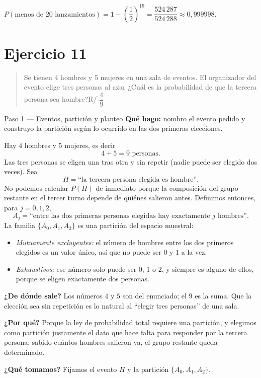 \documentclass[11pt]{article}
\begin{document}
\begin{resp}
$P(\text{menos de 20 lanzamientos})=1-\left(\dfrac{1}{2}\right)^{19}=\dfrac{524\,287}{524\,288}\approx 0{,}999998$.
\end{resp}

\section*{Ejercicio 11}

\begin{quote}
Se tienen 4 hombres y 5 mujeres en una sala de eventos. El organizador del evento elige tres personas al azar ¿Cuál es la probabilidad de que la tercera persona sea hombre?\hfill R/ $\dfrac{4}{9}$
\end{quote}

\begin{paso}{Paso 1 --- Eventos, partición y planteo}
\textbf{Qué hago:} nombro el evento pedido y construyo la partición según lo ocurrido en las dos primeras elecciones.

Hay $4$ hombres y $5$ mujeres, es decir
\[
4+5=9 \text{ personas.}
\]
Las tres personas se eligen una tras otra y sin repetir (nadie puede ser elegido dos veces). Sea
\[
H=\text{``la tercera persona elegida es hombre''}.
\]
No podemos calcular $P(H)$ de inmediato porque la composición del grupo restante en el tercer turno depende de quiénes salieron antes. Definimos entonces, para $j=0,1,2$,
\[
A_j=\text{``entre las dos primeras personas elegidas hay exactamente $j$ hombres''}.
\]
La familia $\{A_0,A_1,A_2\}$ es una partición del espacio muestral:
\begin{itemize}[leftmargin=1.4em]
\item \emph{Mutuamente excluyentes:} el número de hombres entre los dos primeros elegidos es un valor único, así que no puede ser $0$ y $1$ a la vez.
\item \emph{Exhaustivos:} ese número solo puede ser $0$, $1$ o $2$, y siempre es alguno de ellos, porque se eligen exactamente dos personas.
\end{itemize}

\textbf{¿De dónde sale?} Los números $4$ y $5$ son del enunciado; el $9$ es la suma. Que la elección sea sin repetición es lo natural al ``elegir tres personas'' de una sala.

\textbf{¿Por qué?} Porque la ley de probabilidad total requiere una partición, y elegimos como partición justamente el dato que hace falta para responder por la tercera persona: sabido cuántos hombres salieron ya, el grupo restante queda determinado.

\textbf{¿Qué tomamos?} Fijamos el evento $H$ y la partición $\{A_0,A_1,A_2\}$.
\end{paso}
\end{document}
